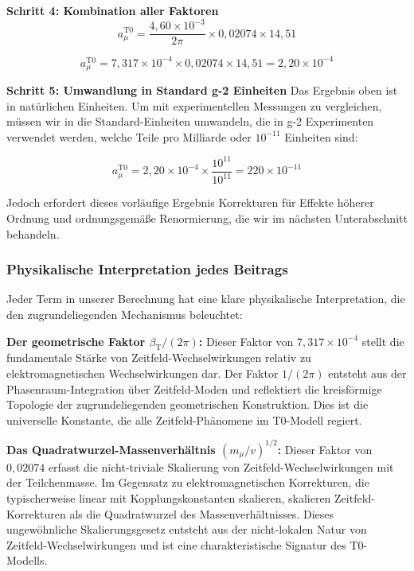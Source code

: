 \documentclass[12pt,a4paper]{article}
\newcommand{\betaT}{\beta_{\text{T}}}
\begin{document}
	\textbf{Schritt 4: Kombination aller Faktoren}
	\begin{equation}
		a_{\mu}^{\text{T0}} = \frac{4{,}60 \times 10^{-3}}{2\pi} \times 0{,}02074 \times 14{,}51
	\end{equation}
	
	\begin{equation}
		a_{\mu}^{\text{T0}} = 7{,}317 \times 10^{-4} \times 0{,}02074 \times 14{,}51 = 2{,}20 \times 10^{-4}
	\end{equation}
	
	\textbf{Schritt 5: Umwandlung in Standard g-2 Einheiten}
	Das Ergebnis oben ist in natürlichen Einheiten. Um mit experimentellen Messungen zu vergleichen, müssen wir in die Standard-Einheiten umwandeln, die in g-2 Experimenten verwendet werden, welche Teile pro Milliarde oder $10^{-11}$ Einheiten sind:
	
	\begin{equation}
		a_{\mu}^{\text{T0}} = 2{,}20 \times 10^{-4} \times \frac{10^{11}}{10^{11}} = 220 \times 10^{-11}
	\end{equation}
	
	Jedoch erfordert dieses vorläufige Ergebnis Korrekturen für Effekte höherer Ordnung und ordnungsgemäße Renormierung, die wir im nächsten Unterabschnitt behandeln.
	
	\subsubsection{Physikalische Interpretation jedes Beitrags}
	
	Jeder Term in unserer Berechnung hat eine klare physikalische Interpretation, die den zugrundeliegenden Mechanismus beleuchtet:
	
	\textbf{Der geometrische Faktor $\betaT/(2\pi)$:}
	Dieser Faktor von $7{,}317 \times 10^{-4}$ stellt die fundamentale Stärke von Zeitfeld-Wechselwirkungen relativ zu elektromagnetischen Wechselwirkungen dar. Der Faktor $1/(2\pi)$ entsteht aus der Phasenraum-Integration über Zeitfeld-Moden und reflektiert die kreisförmige Topologie der zugrundeliegenden geometrischen Konstruktion. Dies ist die universelle Konstante, die alle Zeitfeld-Phänomene im T0-Modell regiert.
	
	\textbf{Das Quadratwurzel-Massenverhältnis $(m_{\mu}/v)^{1/2}$:}
	Dieser Faktor von $0{,}02074$ erfasst die nicht-triviale Skalierung von Zeitfeld-Wechselwirkungen mit der Teilchenmasse. Im Gegensatz zu elektromagnetischen Korrekturen, die typischerweise linear mit Kopplungskonstanten skalieren, skalieren Zeitfeld-Korrekturen als die Quadratwurzel des Massenverhältnisses. Dieses ungewöhnliche Skalierungsgesetz entsteht aus der nicht-lokalen Natur von Zeitfeld-Wechselwirkungen und ist eine charakteristische Signatur des T0-Modells.
	
\end{document}
